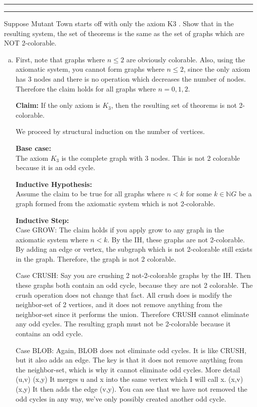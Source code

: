 \documentclass[11pt]{article}
\newcounter{questionCounter}
\newcounter{partCounter}[questionCounter]
\newenvironment{question}[2][\arabic{questionCounter}]{%
    \setcounter{partCounter}{0}%
    \vspace{.25in} \hrule \vspace{0.5em}%
        \noindent{\bf #2}%
    \vspace{0.8em} \hrule \vspace{.10in}%
    \addtocounter{questionCounter}{1}%
}{}
\begin{document}
\begin{question}{The Blob}
 Suppose Mutant Town starts off with only the axiom K3 . Show that in the resulting
 system, the set of theorems is the same as the set of graphs which are NOT 2-colorable.
\begin{enumerate}[a.]
\item First, note that graphs where $n\leq 2$ are obviously colorable.
Also, using the axiomatic system, you cannot form graphs where $n\leq 2$, since 
the only axiom has 3 nodes and there is no operation which decreases the number of nodes.
Therefore the claim holds for all graphs where $n=0,1,2$.

\textbf{Claim:} If the only axiom is $K_3$, then the resulting set of theorems is not 2-colorable.

We proceed by structural induction on the number of vertices.

\textbf{Base case:}\\
The axiom $K_3$ is the complete graph with 3 nodes. This is not 2 colorable because it is
an odd cycle. 

\textbf{Inductive Hypothesis:}\\
Assume the claim to be true for all graphs where $n<k$ for some $k\in\mathbb{N}$$G$ be a graph formed from the axiomatic system which is not 2-colorable.

\textbf{Inductive Step:}\\
Case GROW: The claim holds if you apply grow to any graph in the axiomatic system where $n<k$. By the IH, these graphs are not 2-colorable. By adding an edge or vertex, the subgraph
which is not 2-colorable still exists in the graph. Therefore, the graph is not 2 colorable.\

Case CRUSH: Say you are crushing 2 not-2-colorable graphs by the IH. Then these graphs both contain an odd cycle, because they are not
2 colorable. The crush operation does not change that fact. All crush does is modify the neighbor-set of 2 vertices, and it does
not remove anything from the neighbor-set since it performs the union. Therefore CRUSH cannot eliminate any odd cycles. The resulting
graph must not be 2-colorable because it contains an odd cycle.

Case BLOB: Again, BLOB does not eliminate odd cycles. It is like CRUSH, but it also adds an edge. The key is that it does not remove 
anything from the neighbor-set, which is why it cannot eliminate odd cycles. More detail
(u,v) (x,y)
It merges u and x into the same vertex which I will call x.
(x,v) (x,y)
It then adds the edge (v,y). You can see that we have not removed the odd cycles in any way, we've only possibly created another
odd cycle.


\end{enumerate}
\end{question}
\end{document}
